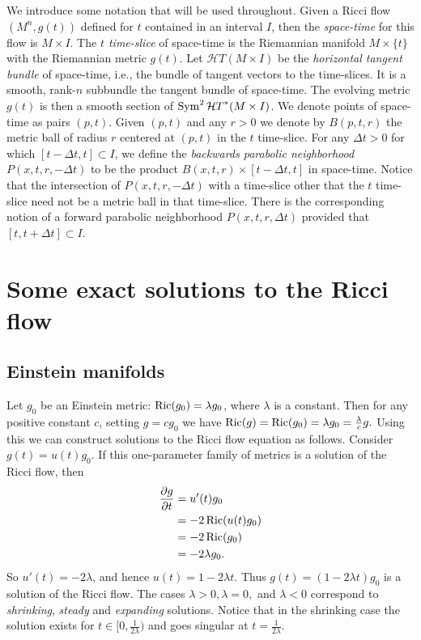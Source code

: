 \begin{definition}\label{def:space-time}
\label{defnRicci}


We introduce some notation that will be used throughout. Given a
Ricci flow $(M^n,g(t))$ defined for $t$ contained in an interval
$I$, then the {\sl space-time} for this flow is  $M\times I$.  The
{\sl $t$ time-slice} of space-time is the Riemannian manifold
$M\times\{t\}$ with the Riemannian metric $g(t)$. Let ${\mathcal
HT}(M\times I)$ be the {\em horizontal tangent
bundle} of space-time, i.e., the
bundle of tangent vectors to the time-slices. It is a smooth,
rank-$n$ subbundle the tangent bundle of space-time. The evolving
metric $g(t)$ is then a smooth section of $\operatorname{Sym}^2{\mathcal
HT}^*(M\times I)$. We denote points of space-time as pairs $(p,t)$.
Given $(p,t)$ and any $r>0$ we denote by $B(p,t,r)$ the metric ball
of radius $r$ centered at $(p,t)$ in the $t$ time-slice. For any
$\Delta t>0$ for which $[t-\Delta t,t]\subset I$, we define the {\sl
backwards parabolic neighborhood}
$P(x,t,r,-\Delta t)$ to be the product $B(x,t,r)\times
[t-\Delta t,t]$ in space-time. Notice that the intersection of
$P(x,t,r,-\Delta t)$ with a time-slice other that the $t$ time-slice
need not be a metric ball in that time-slice. There is the
corresponding notion of a forward parabolic neighborhood
$P(x,t,r,\Delta t)$ provided that $[t,t+\Delta t]\subset I$.
\end{definition}






\section{Some exact solutions to the Ricci flow}

\subsection{Einstein manifolds}
Let $g_0$ be an Einstein metric: $\operatorname{Ric}(g_0) = \lambda g_0$, where $\lambda$ is a constant. Then for
any positive constant $c$, setting $g = cg_0$ we have $\operatorname{Ric}(g)
= \operatorname{Ric}(g_0) = \lambda g_0= \frac{\lambda}{c} g.$ Using this we
can construct solutions to the Ricci flow equation as follows.
Consider $g(t) = u(t)g_{0}$. If this one-parameter family of
metrics is a solution of the Ricci flow, then
\begin{align*}
\frac{\partial g}{\partial t}& =u'(t)g_{0}\\& = -2\operatorname{Ric}(u(t)g_{0})\\&
= -2\operatorname{Ric}(g_{0})\\& = -2\lambda g_{0}.
\end{align*}
So $u'(t)= -2\lambda$,  and hence $u(t) = 1-2 \lambda t$. Thus
$g(t)= (1-2 \lambda t)g_{0}$ is a solution of the Ricci flow. The
cases $\lambda
>0, \lambda=0,$ and $\lambda< 0$ correspond to \textit{shrinking}, \textit{steady}
and \textit{expanding} solutions. Notice that in the shrinking case the
solution exists for $t\in [0,\frac{1}{2\lambda})$ and goes singular at
$t=\frac{1}{2\lambda}$.

